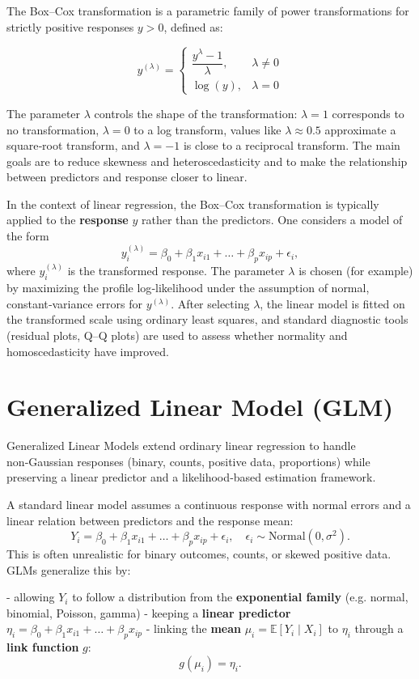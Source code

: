 The Box–Cox transformation is a parametric family of power transformations for strictly positive responses $y > 0$, defined as:

\[
y^{(\lambda)} =
\begin{cases}
\dfrac{y^\lambda - 1}{\lambda}, & \lambda \neq 0 \\
\log(y), & \lambda = 0
\end{cases}
\]

The parameter $\lambda$ controls the shape of the transformation: $\lambda = 1$ corresponds to no transformation, $\lambda = 0$ to a log transform, values like $\lambda \approx 0.5$ approximate a square‑root transform, and $\lambda = -1$ is close to a reciprocal transform. The main goals are to reduce skewness and heteroscedasticity and to make the relationship between predictors and response closer to linear.

In the context of linear regression, the Box–Cox transformation is typically applied to the \textbf{response} $y$ rather than the predictors. One considers a model of the form
\[
y_i^{(\lambda)} = \beta_0 + \beta_1 x_{i1} + \dots + \beta_p x_{ip} + \epsilon_i,
\]
where $y_i^{(\lambda)}$ is the transformed response. The parameter $\lambda$ is chosen (for example) by maximizing the profile log‑likelihood under the assumption of normal, constant‑variance errors for $y^{(\lambda)}$. After selecting $\lambda$, the linear model is fitted on the transformed scale using ordinary least squares, and standard diagnostic tools (residual plots, Q–Q plots) are used to assess whether normality and homoscedasticity have improved.


\newpage
\section{Generalized Linear Model (GLM)}

Generalized Linear Models extend ordinary linear regression to handle non‑Gaussian responses (binary, counts, positive data, proportions) while preserving a linear predictor and a likelihood‑based estimation framework.

A standard linear model assumes a continuous response with normal errors and a linear relation between predictors and the response mean:
\[
Y_i = \beta_0 + \beta_1 x_{i1} + \dots + \beta_p x_{ip} + \epsilon_i,
\quad \epsilon_i \sim \text{Normal}(0,\sigma^2).
\]
This is often unrealistic for binary outcomes, counts, or skewed positive data. GLMs generalize this by:

- allowing $Y_i$ to follow a distribution from the \textbf{exponential family} (e.g. normal, binomial, Poisson, gamma)  
- keeping a \textbf{linear predictor} $\eta_i = \beta_0 + \beta_1 x_{i1} + \dots + \beta_p x_{ip}$  
- linking the \textbf{mean} $\mu_i = \mathbb{E}[Y_i\mid X_i]$ to $\eta_i$ through a \textbf{link function} $g$:
  \[
  g(\mu_i) = \eta_i.
  \]

